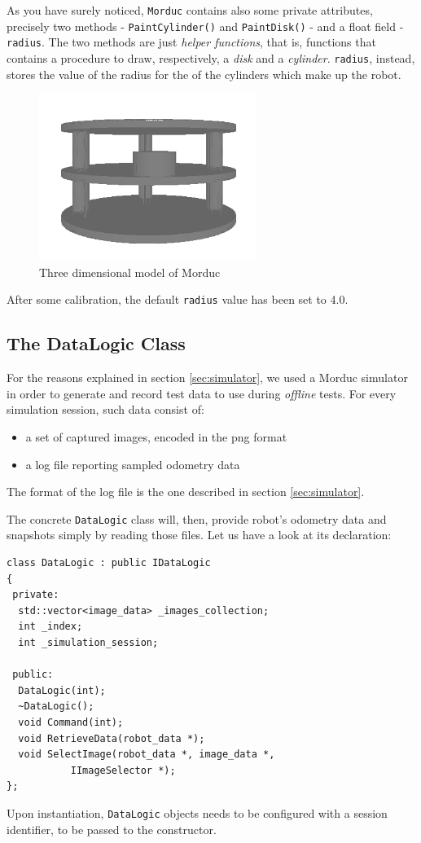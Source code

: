 %
As you have surely noticed, \texttt{Morduc} contains also 
some private attributes, precisely two methods - 
\texttt{PaintCylinder()} and \texttt{PaintDisk()} - and 
a float field - \texttt{radius}.
%
The two methods are just \textit{helper functions}, that is, 
functions that contains a procedure to draw, respectively,  
a \textit{disk} and a \textit{cylinder}.
%
\texttt{radius}, instead, stores the value of the radius 
for the of the cylinders which make up the robot.
%
\begin{figure}[!h]
  \begin{center}
    \includegraphics[width=200pt]{img/3morduc_opengl.png}
    \caption{Three dimensional model of Morduc}
    \label{fig:3morduc_opengl}
  \end{center}
\end{figure}
%
After some calibration, the default \texttt{radius} value 
has been set to 4.0.
%

%
\subsection{The DataLogic Class}
\label{sub:datalogic}
For the reasons explained in section \ref{sec:simulator}, 
we used a Morduc simulator in order to generate and record 
test data to use during \textit{offline} tests.
%
For every simulation session, such data consist of:
%
\begin{itemize}
  \item a set of captured images, encoded in the png format
  \item a log file reporting sampled odometry data
\end{itemize}
%
The format of the log file is the one described in section 
\ref{sec:simulator}.
%

%
The concrete \texttt{DataLogic} class will, then, provide 
robot's odometry data and snapshots simply by reading 
those files.
%
Let us have a look at its declaration:
%
\begin{lstlisting}[caption={\texttt{DataLogic} declaration}, label={code:datalogic}, frame=trBL]
class DataLogic : public IDataLogic
{
 private:
  std::vector<image_data> _images_collection;
  int _index;
  int _simulation_session;
  
 public:
  DataLogic(int);
  ~DataLogic();
  void Command(int);
  void RetrieveData(robot_data *);
  void SelectImage(robot_data *, image_data *,
		   IImageSelector *);
};
\end{lstlisting}
%
Upon instantiation, \texttt{DataLogic} objects needs to be 
configured with a session identifier, to be passed to 
the constructor. 
%

